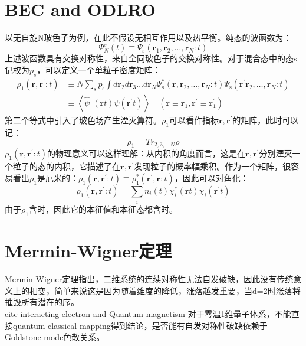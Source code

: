 \documentclass[10pt,openany]{book}
\theoremstyle{thmstyle} %
\theoremstyle{defstyle} %
\theoremstyle{prostyle} %
\begin{document}
\section{BEC and ODLRO}
以无自旋N玻色子为例，在此不假设无相互作用以及热平衡。纯态的波函数为：
\begin{equation}
  \Psi_N^s(t) \equiv \Psi_{\mathrm{s}}\left(\boldsymbol{r}_1, \boldsymbol{r}_2, \ldots, \boldsymbol{r}_N: t\right)
\end{equation}
上述波函数具有交换对称性，来自全同玻色子的交换对称性。对于混合态中的态s记权为$ p_s $，可以定义一个单粒子密度矩阵：
\begin{equation}
  \begin{aligned}
    \rho_1\left(\boldsymbol{r}, \boldsymbol{r}^{\prime}: t\right) & \equiv N \sum_s p_{\mathrm{s}} \int d \boldsymbol{r}_2 d \boldsymbol{r}_3 \ldots d \boldsymbol{r}_N \Psi_{\mathrm{s}}^*\left(\boldsymbol{r}, \boldsymbol{r}_2, \ldots, \boldsymbol{r}_N: t\right) \Psi_{\mathrm{s}}\left(\boldsymbol{r}^{\prime} \boldsymbol{r}_2, \ldots, \boldsymbol{r}_N: t\right) \\
    & \equiv\left\langle\hat{\psi}^{\dagger}(\boldsymbol{r} t) \hat{\psi}\left(\boldsymbol{r}^{\prime} t\right)\right\rangle \quad\left(\boldsymbol{r} \equiv \boldsymbol{r}_1, \boldsymbol{r}^{\prime} \equiv \boldsymbol{r}_1^{\prime}\right)
    \end{aligned}
\end{equation}
第二个等式中引入了玻色场产生湮灭算符。$ \rho_1 $可以看作指标$ \boldsymbol{r}, \boldsymbol{r}^{\prime} $的矩阵，此时可以记：
\begin{equation}
  \rho_1 =Tr_{2,3,\dots N}\rho
\end{equation} 
$ \rho_1\left(\boldsymbol{r}, \boldsymbol{r}^{\prime}: t\right) $的物理意义可以这样理解：从内积的角度而言，这是在$ \boldsymbol{r}, \boldsymbol{r}^{\prime} $分别湮灭一个粒子的态的内积，它描述了在$ \boldsymbol{r}, \boldsymbol{r}^{\prime} $发现粒子的概率幅乘积。作为一个矩阵，很容易看出$ \rho_1 $是厄米的：$ \rho_1\left(\boldsymbol{r}, \boldsymbol{r}^{\prime}: t\right) \equiv \rho_1^*\left(\boldsymbol{r}^{\prime}, \boldsymbol{r}: t\right) $，因此可以对角化：
\begin{equation}
  \rho_1\left(\boldsymbol{r}, \boldsymbol{r}^{\prime}: t\right)=\sum_i n_i(t) \chi_i^*(\boldsymbol{r} t) \chi_i\left(\boldsymbol{r}^{\prime} t\right)
\end{equation}
由于$ \rho_1 $含时，因此它的本征值和本征态都含时。
\
\section{Mermin-Wigner定理}
Mermin-Wigner定理指出，二维系统的连续对称性无法自发破缺，因此没有传统意义上的相变，简单来说这是因为随着维度的降低，涨落越发重要，当d=2时涨落将摧毁所有潜在的序。\\
cite interacting electron and Quantum magnetism
对于零温1维量子体系，不能直接quantum-classical mapping得到结论，是否能有自发对称性破缺依赖于Goldstone mode色散关系。
\end{document}

